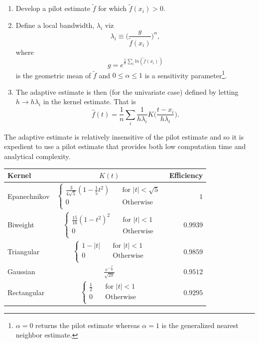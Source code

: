 \documentclass[
twoside,
openright,
titlepage,
numbers=noenddot,
headinclude,%
footinclude=true,
dottedtoc, %
ngerman,
american, %
pagesize=pdftex,
]{book}
\begin{document}
	\begin{enumerate}
		\item Develop a pilot estimate $\tilde{f}$ for which $\tilde{f}(x_i)>0$.
		\item Define a local bandwidth, $\lambda_i$ viz
		\begin{equation}
			\lambda_i\equiv \bigg(\frac{g}{\tilde{f}(x_i)}\bigg)^\alpha,
			\label{lam}
		\end{equation}
		where
		\begin{equation}
			g=e^{\frac{1}{n}\sum_{i}ln(\tilde{f}(x_i))}
		\end{equation}
		is the geometric mean of $\tilde{f}$ and $0\leq \alpha\leq 1$ is a sensitivity parameter\footnote{$\alpha=0$ returns the pilot estimate whereas $\alpha=1$ is the generalized nearest neighbor estimate.}. 
		\item The adaptive estimate is then (for the univariate case) defined  by letting $h\rightarrow h\lambda_i$ in the kernel estimate. That is
		\begin{equation}
			\hat{f}(t)=\frac{1}{n}\sum_{i}\frac{1}{h\lambda_i}K\bigg(\frac{t-x_i}{h\lambda_i}\bigg).
		\end{equation}
	\end{enumerate}
	The adaptive estimate is relatively insensitive of the pilot estimate and so it is expedient to use a pilot estimate that provides both low computation time and analytical complexity.
	\begin{center}
		\begin{tabular}{ l| c r}
			Kernel & $K(t)$ & Efficiency \\
			\hline
			Epanechnikov & $\begin{cases}
				\frac{3}{4\sqrt{5}}(1-\frac{1}{5}t^2)&\quad \text{for } |t|<\sqrt{5}\\
				0&\quad \text{Otherwise}\\
			\end{cases}$  & $1$\\
			Biweight & $\begin{cases}
				\frac{15}{16}(1-t^2)^2&\quad \text{for } |t|<1\\
				0&\quad \text{Otherwise}\\
			\end{cases}$  & $0.9939$\\
			Triangular & $\begin{cases}
				1-|t|&\quad \text{for } |t|<1\\
				0&\quad \text{Otherwise}\\
			\end{cases}$  & $0.9859$\\
			Gaussian & $\frac{e^{-\frac{t^2}{2}}}{\sqrt{2\pi}}$  & $0.9512$\\
			Rectangular & $\begin{cases}
				\frac{1}{2}&\quad \text{for } |t|<1\\
				0&\quad \text{Otherwise}\\
			\end{cases}$  & $0.9295$\\
		\end{tabular}
		\captionsetup{width=0.95\textwidth}
		\label{t2}
	\end{center}
\end{document}
